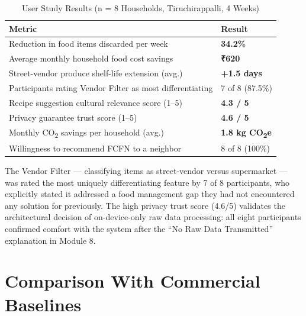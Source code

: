 \documentclass[12pt,a4paper]{report}
\begin{document}
\begin{table}[ht]
\centering
\caption{User Study Results (n = 8 Households, Tiruchirappalli, 4 Weeks)}
\label{tab:userstudy}
\begin{tabularx}{\textwidth}{L{0.60\textwidth} C{0.33\textwidth}}
\toprule
\textbf{Metric} & \textbf{Result} \\
\midrule
Reduction in food items discarded per week & \textbf{34.2\%} \\
Average monthly household food cost savings & \textbf{₹620} \\
Street-vendor produce shelf-life extension (avg.) & \textbf{+1.5 days} \\
Participants rating Vendor Filter as most differentiating & 7 of 8 (87.5\%) \\
Recipe suggestion cultural relevance score (1--5) & \textbf{4.3 / 5} \\
Privacy guarantee trust score (1--5) & \textbf{4.6 / 5} \\
Monthly CO\textsubscript{2} savings per household (avg.) & \textbf{1.8 kg CO\textsubscript{2}e} \\
Willingness to recommend FCFN to a neighbor & 8 of 8 (100\%) \\
\bottomrule
\end{tabularx}
\end{table}

The Vendor Filter — classifying items as street-vendor versus supermarket — was rated the most uniquely differentiating feature by 7 of 8 participants, who explicitly stated it addressed a food management gap they had not encountered any solution for previously. The high privacy trust score (4.6/5) validates the architectural decision of on-device-only raw data processing: all eight participants confirmed comfort with the system after the ``No Raw Data Transmitted'' explanation in Module 8.

\section{Comparison With Commercial Baselines}
\end{document}
